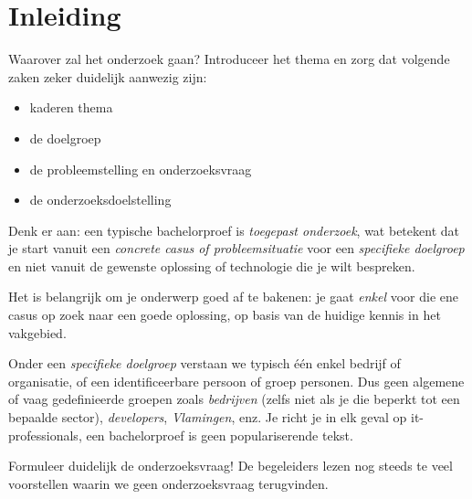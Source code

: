 \documentclass{hogent-article}
\begin{document}
% 
%
%
%

\section{Inleiding}%
\label{sec:inleiding}


Waarover zal het onderzoek gaan? Introduceer het thema en zorg dat volgende zaken zeker duidelijk aanwezig zijn:

\begin{itemize}
  \item kaderen thema
  \item de doelgroep
  \item de probleemstelling en onderzoeksvraag
  \item de onderzoeksdoelstelling
\end{itemize}

Denk er aan: een typische bachelorproef is \emph{toegepast onderzoek}, wat betekent dat je start vanuit een \emph{concrete casus of probleemsituatie} voor een \emph{specifieke doelgroep} en niet vanuit de gewenste oplossing of technologie die je wilt bespreken.

Het is belangrijk om je onderwerp goed af te bakenen: je gaat \emph{enkel} voor die ene casus op zoek naar een goede oplossing, op basis van de huidige kennis in het vakgebied.

Onder een \emph{specifieke doelgroep} verstaan we typisch één enkel bedrijf of organisatie, of een identificeerbare persoon of groep personen. Dus geen algemene of vaag gedefinieerde groepen zoals \emph{bedrijven} (zelfs niet als je die beperkt tot een bepaalde sector), \emph{developers}, \emph{Vlamingen}, enz. Je richt je in elk geval op it-professionals, een bachelorproef is geen populariserende tekst.

Formuleer duidelijk de onderzoeksvraag! De begeleiders lezen nog steeds te veel voorstellen waarin we geen onderzoeksvraag terugvinden.
\end{document}
